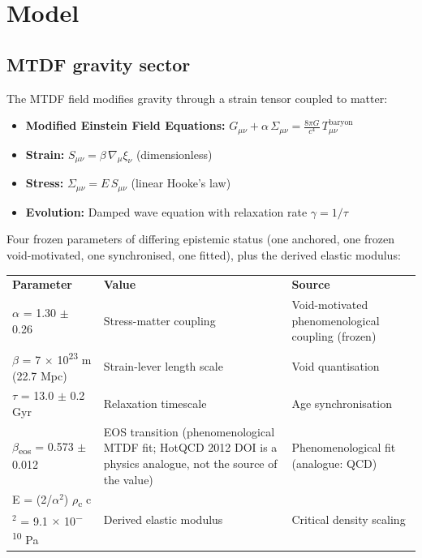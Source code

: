 \documentclass[11pt,a4paper]{article}
\begin{document}
\section{Model}
\label{sec:model}

\subsection{MTDF gravity sector}
The MTDF field modifies gravity through a strain tensor coupled to matter:

\begin{itemize}
  \item \textbf{Modified Einstein Field Equations:} \(G_{\mu\nu} + \alpha\,\Sigma_{\mu\nu} = \frac{8\pi G}{c^4}\,T_{\mu\nu}^{\mathrm{baryon}}\)
  \item \textbf{Strain:} \(S_{\mu\nu} = \beta\,\nabla_\mu\xi_\nu\) (dimensionless)
  \item \textbf{Stress:} \(\Sigma_{\mu\nu} = E\,S_{\mu\nu}\) (linear Hooke's law)
  \item \textbf{Evolution:} Damped wave equation with relaxation rate \(\gamma = 1/\tau\)
\end{itemize}

Four frozen parameters of differing epistemic status (one anchored, one frozen void-motivated, one synchronised, one fitted), plus the derived elastic modulus:

\begin{table}[H]
\centering
\footnotesize
\begin{tabularx}{\linewidth}{l>{\RaggedRight\arraybackslash}X>{\RaggedRight\arraybackslash}X}
\toprule
\textbf{Parameter} & \textbf{Value} & \textbf{Source} \tabularnewline
$\alpha$ = 1.30 $\pm$ 0.26 & Stress-matter coupling & Void-motivated phenomenological coupling (frozen) \tabularnewline
$\beta$ = 7 $\times$ 10\textsuperscript{23} m (22.7 Mpc) & Strain-lever length scale & Void quantisation \tabularnewline
$\tau$ = 13.0 $\pm$ 0.2 Gyr & Relaxation timescale & Age synchronisation \tabularnewline
$\beta$\textsubscript{eos} = 0.573 $\pm$ 0.012 & EOS transition (phenomenological MTDF fit; HotQCD 2012 DOI is a physics analogue, not the source of the value) & Phenomenological fit (analogue: QCD) \tabularnewline
E = (2/\allowbreak{}$\alpha$$^{2}$) $\rho$\textsubscript{c} c$^{2}$ = 9.1 $\times$ 10\textsuperscript{$-$10} Pa & Derived elastic modulus & Critical density scaling \tabularnewline
\bottomrule
\end{tabularx}
\end{table}
\end{document}
